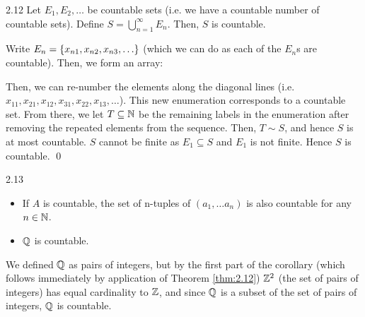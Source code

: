 \begin{theorem}{}{2.12}
    Let $E_1, E_2, \ldots$ be countable sets (i.e. we have a countable number of countable sets). Define $S = \bigcup_{n=1}^{\infty} E_n$. Then, $S$ is countable. 
\end{theorem}
\begin{nproof}
    Write $E_n = \set{x_{n1}, x_{n2}, x_{n3}, \ldots}$ (which we can do as each of the $E_n$s are countable). Then, we form an array:
    \begin{center}
    \end{center}
    Then, we can re-number the elements along the diagonal lines (i.e. $x_{11}, x_{21}, x_{12}, x_{31}, x_{22}, x_{13}, \ldots$). This new enumeration corresponds to a countable set. From there, we let $T \subseteq \mathbb{N}$ be the remaining labels in the enumeration after removing the repeated elements from the sequence. Then, $T \sim S$, and hence $S$ is at most countable. $S$ cannot be finite as $E_1 \subseteq S$ and $E_1$ is not finite. Hence $S$ is countable. \qed
\end{nproof}

\begin{corollary}{}{2.13}
    \begin{itemize}
        \item If $A$ is countable, the set of n-tuples of $(a_1, \ldots a_n)$ is also countable for any $n \in \mathbb{N}$.  
        \item $\mathbb{Q}$ is countable.
    \end{itemize}
\end{corollary}
\noindent We defined $\mathbb{Q}$ as pairs of integers, but by the first part of the corollary (which follows immediately by application of Theorem \ref{thm:2.12}) $\mathbb{Z}^2$ (the set of pairs of integers) has equal cardinality to $\mathbb{Z}$, and since $\mathbb{Q}$ is a subset of the set of pairs of integers, $\mathbb{Q}$ is countable. 

